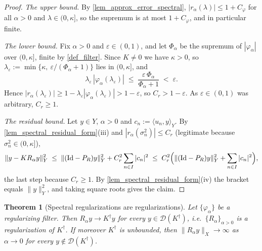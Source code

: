 \documentclass[a4paper]{report}
\theoremstyle{plain}
\newtheorem{theorem}{Theorem}[chapter]
\theoremstyle{definition}
\theoremstyle{remark}
\newcommand{\Dom}{\mathcal{D}}
\newcommand{\Id}{\mathrm{Id}}
\newcommand{\dg}{^{\dagger}}
\begin{document}
\begin{proof}
  \emph{The upper bound.}  By \cref{lem_approx_error_spectral},
  $|r_{\alpha}(\lambda)| \le 1 + C_{\varphi}$ for all $\alpha > 0$ and
  $\lambda \in (0,\kappa]$, so the supremum is at most $1 + C_{\varphi}$, and in
  particular finite.

  \emph{The lower bound.}  Fix $\alpha > 0$ and $\varepsilon \in (0,1)$, and let
  $\Phi_{\alpha}$ be the supremum of $|\varphi_{\alpha}|$ over $(0,\kappa]$, finite by
  \cref{def_filter}.  Since $K \ne 0$ we have $\kappa > 0$, so
  $\lambda_{\varepsilon} := \min\{\kappa,\ \varepsilon/(\Phi_{\alpha}+1)\}$ lies in
  $(0,\kappa]$, and
  \[
    \lambda_{\varepsilon}\,|\varphi_{\alpha}(\lambda_{\varepsilon})|
      \;\le\; \frac{\varepsilon\,\Phi_{\alpha}}{\Phi_{\alpha}+1} \;<\; \varepsilon .
  \]
  Hence $|r_{\alpha}(\lambda_{\varepsilon})| \ge 1 - \lambda_{\varepsilon}
  |\varphi_{\alpha}(\lambda_{\varepsilon})| > 1 - \varepsilon$, so $C_r > 1 -
  \varepsilon$.  As $\varepsilon \in (0,1)$ was arbitrary, $C_r \ge 1$.

  \emph{The residual bound.}  Let $y \in Y$, $\alpha > 0$ and $c_n := \langle u_n,
  y\rangle_Y$.  By \cref{lem_spectral_residual_form}(iii) and
  $|r_{\alpha}(\sigma_n^{2})| \le C_r$ (legitimate because $\sigma_n^{2} \in
  (0,\kappa]$),
  \[
    \|y - KR_{\alpha}y\|_Y^{2} \;\le\; \|(\Id - P_R)y\|_Y^{2}
      + C_r^{2}\sum_{n \in I}|c_n|^{2}
    \;\le\; C_r^{2}\Bigl(\|(\Id - P_R)y\|_Y^{2} + \sum_{n \in I}|c_n|^{2}\Bigr),
  \]
  the last step because $C_r \ge 1$.  By \cref{lem_spectral_residual_form}(iv) the
  bracket equals $\|y\|_Y^{2}$, and taking square roots gives the claim.
\end{proof}


\begin{theorem}[Spectral regularizations are regularizations]
  \label{thm_spectral_is_regularization}
  Let $\{\varphi_{\alpha}\}$ be a regularizing filter.  Then $R_{\alpha}y \to K\dg y$ for
  every $y \in \Dom(K\dg)$, i.e.\ $\{R_{\alpha}\}_{\alpha>0}$ is a regularization of
  $K\dg$.  If moreover $K\dg$ is unbounded, then $\|R_{\alpha}y\|_X \to \infty$ as
  $\alpha \to 0$ for every $y \notin \Dom(K\dg)$.
\end{theorem}
\end{document}
